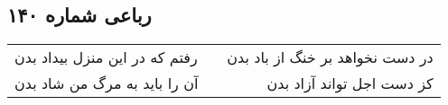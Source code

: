 \begin{center}
\section*{رباعی شماره ۱۴۰}
\label{sec:sh140}
\begin{longtable}{l p{0.5cm} r}
رفتم که در این منزل بیداد بدن
&&
در دست نخواهد بر خنگ از باد بدن
\\
آن را باید به مرگ من شاد بدن
&&
کز دست اجل تواند آزاد بدن
\\
\end{longtable}
\end{center}
